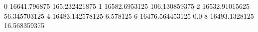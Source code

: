 0 16641.796875 165.232421875
1 16582.6953125 106.130859375
2 16532.91015625 56.345703125
4 16483.142578125 6.578125
6 16476.564453125 0.0
8 16493.1328125 16.568359375
